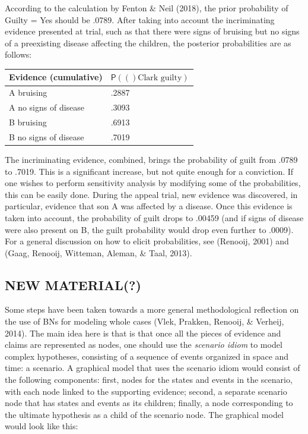 \documentclass[11pt,dvipsnames,enabledeprecatedfontcommands]{scrartcl}
\newcommand{\pr}[1]{\mathsf{P}(#1)}
\begin{document}
According to the calculation by Fenton \& Neil (2018), the prior
probability of \textrm{Guilty = Yes} should be .0789. After taking into
account the incriminating evidence presented at trial, such as that
there were signs of bruising but no signs of a preexisting disease
affecting the children, the posterior probabilities are as follows:

\begin{center}
\begin{tabular}{@{}ll@{}}
\toprule
Evidence (cumulative) & $\pr(\textrm{Clark guilty})$ 
\\ \midrule 
A bruising& .2887\\
A no signs of disease & .3093\\
B bruising & .6913\\
B no signs of disease  & .7019\\
 \bottomrule
\end{tabular}
\end{center}

\noindent  The incriminating evidence, combined, brings the probability
of guilt from .0789 to .7019. This is a significant increase, but not
quite enough for a conviction. If one wishes to perform sensitivity
analysis by modifying some of the probabilities, this can be easily
done. During the appeal trial, new evidence was discovered, in
particular, evidence that son A was affected by a disease. Once this
evidence is taken into account, the probability of guilt drops to .00459
(and if signs of disease were also present on B, the guilt probability
would drop even further to .0009). For a general discussion on how to
elicit probabilities, see (Renooij, 2001) and (Gaag, Renooij, Witteman,
Aleman, \& Taal, 2013).

\hypertarget{new-material}{%
\subsection{NEW MATERIAL(?)}\label{new-material}}

Some steps have been taken towards a more general methodological
reflection on the use of BNs for modeling whole cases (Vlek, Prakken,
Renooij, \& Verheij, 2014). The main idea here is that is that once all
the pieces of evidence and claims are represented as nodes, one should
use the \textit{scenario idiom} to model complex hypotheses, consisting
of a sequence of events organized in space and time: a scenario. A
graphical model that uses the scenario idiom would consist of the
following components: first, nodes for the states and events in the
scenario, with each node linked to the supporting evidence; second, a
separate scenario node that has states and events as its children;
finally, a node corresponding to the ultimate hypothesis as a child of
the scenario node. The graphical model would look like this:
\end{document}
